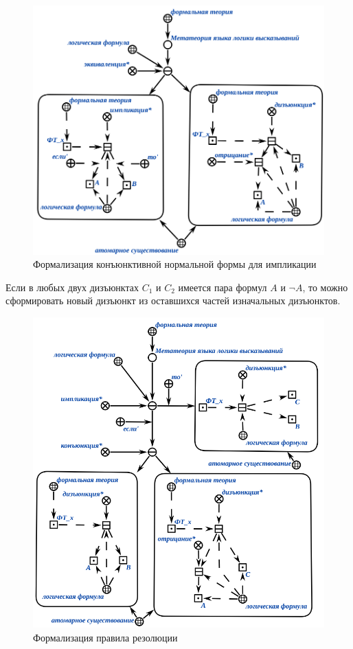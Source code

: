 \begin{figure}[H]
	\includegraphics[scale=0.6]{author/part3/figures/conjunction_implication_rule.png}
	\caption{Формализация конъюнктивной нормальной формы для импликации}
	\label{fig:conjunction_implication_rule}
\end{figure}

Если в любых двух дизъюнктах $C_1$ и $C_2$ имеется пара формул $A$ и $\neg A$, то можно сформировать новый дизъюнкт из оставшихся частей изначальных дизъюнктов.

\begin{figure}[H]
	\includegraphics[scale=0.6]{author/part3/figures/resolution.png}
	\caption{Формализация правила резолюции}
	\label{fig:resolution}
\end{figure}

